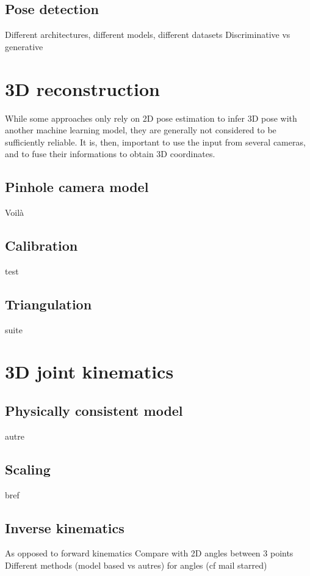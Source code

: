 

\subsection{Pose detection}

Different architectures, different models, different datasets
Discriminative vs generative

\section{3D reconstruction}\label{sec:3D reconstruction}

While some approaches only rely on 2D pose estimation to infer 3D pose with another machine learning model, they are generally not considered to be sufficiently reliable. It is, then, important to use the input from several cameras, and to fuse their informations to obtain 3D coordinates.


\subsection{Pinhole camera model}

Voilà


\subsection{Calibration}

test


\subsection{Triangulation}

suite


\section{3D joint kinematics}

\subsection{Physically consistent model}

autre


\subsection{Scaling}

bref


\subsection{Inverse kinematics}

As opposed to forward kinematics \newline
Compare with 2D angles between 3 points \newline
Different methods (model based vs autres) for angles (cf mail starred)\newline




